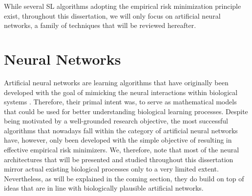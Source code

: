 While several SL algorithms adopting the empirical risk minimization principle exist, throughout this dissertation, we will only focus on artificial neural networks, a family of techniques that will be reviewed hereafter.  

\section{Neural Networks}
\label{sec:neural_networks}
Artificial neural networks are learning algorithms that have originally been developed with the goal of mimicking the neural interactions within biological systems \cite{mitchell1997machine}. Therefore, their primal intent was, to serve as mathematical models that could be used for better understanding biological learning processes. Despite being motivated by a well-grounded research objective, the most successful algorithms that nowadays fall within the category of artificial neural networks have, however, only been developed with the simple objective of resulting in effective empirical risk minimizers. We, therefore, note that most of the neural architectures that will be presented and studied throughout this dissertation mirror actual existing biological processes only to a very limited extent. Nevertheless, as will be explained in the coming section, they do build on top of ideas that are in line with biologically plausible artificial networks.   

